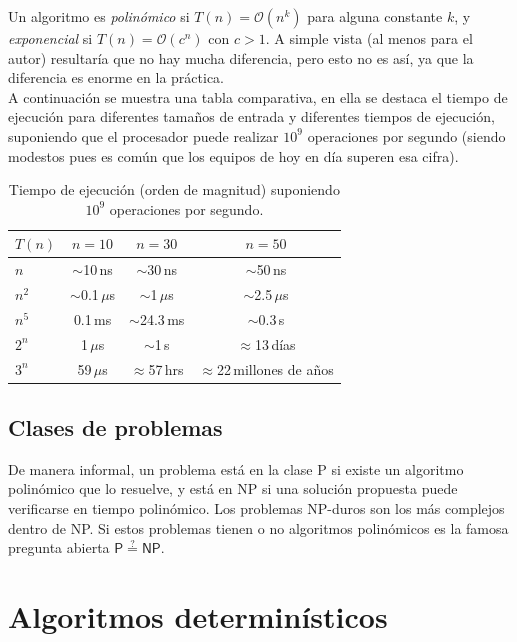 \documentclass[12pt,letterpaper]{article}
\begin{document}
Un algoritmo es \emph{polinómico} si $T(n) = \mathcal{O}(n^k)$ para alguna 
constante $k$, y \emph{exponencial} si $T(n) = \mathcal{O}(c^n)$ con $c>1$. 
A simple vista (al menos para el autor) resultaría  que no hay mucha diferencia, 
pero esto no es así, ya que la diferencia es enorme en la práctica.\\
A continuación se muestra una tabla comparativa, en ella se destaca el tiempo de
ejecución para diferentes tamaños de entrada y diferentes tiempos de ejecución, 
suponiendo que el procesador puede realizar $10^9$ operaciones por segundo 
(siendo modestos pues es común que los equipos de hoy en día superen esa cifra).

\begin{table}[ht]
\centering
\small
\caption{Tiempo de ejecución (orden de magnitud) suponiendo
$10^{9}$ operaciones por segundo.}
\label{tab:explosion}
\begin{tabular}{|l|c|c|c|}
\hline
$T(n)$ & $n=10$ & $n=30$ & $n=50$ \\
\hline
$n$    & $\sim$10\,ns      & $\sim$30\,ns   & $\sim$50\,ns        \\
$n^2$  & $\sim$0.1\,$\mu$s & $\sim$1\,$\mu$s & $\sim$2.5\,$\mu$s   \\
$n^5$  & 0.1\,ms           & $\sim$24.3\,ms    & $\sim$0.3\,s      \\
$2^n$  & 1\,$\mu$s         & $\sim$1\,s     & $\approx$13\,días   \\
$3^n$  & 59\,$\mu$s        & $\approx$57\,hrs    & $\approx$22\,millones de años    \\
\hline
\end{tabular}
\end{table}

\subsection{Clases de problemas}
De manera informal, un problema está en la clase \textsf{P} si existe un 
algoritmo polinómico que lo resuelve, y está en \textsf{NP} si una solución 
propuesta puede verificarse en tiempo polinómico. Los problemas 
\textsf{NP}-duros son los más complejos dentro de \textsf{NP}. Si estos 
problemas tienen o no algoritmos polinómicos es la famosa pregunta abierta 
$\mathsf{P}\stackrel{?}{=}\mathsf{NP}$.



\section{Algoritmos determinísticos}
\label{sec:det}
\end{document}
